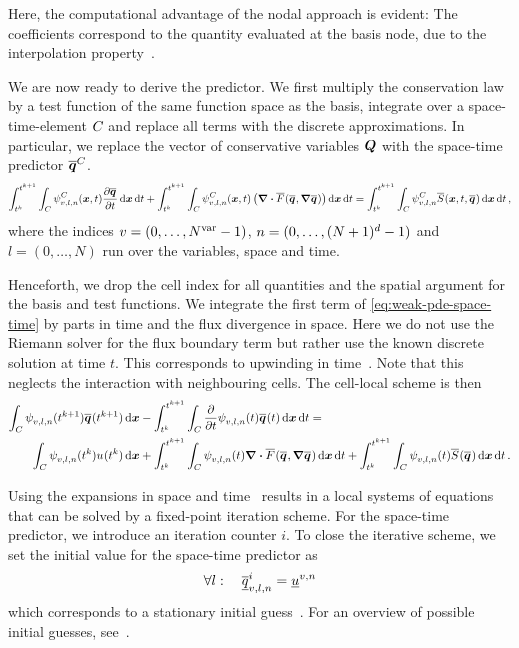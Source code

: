 Here, the computational advantage of the nodal approach is evident:
The coefficients correspond to the quantity evaluated at the basis node, due to the interpolation property~.

We are now ready to derive the predictor.
We first multiply the conservation law by a test function of the same function space as the basis, integrate over a space-time-element $C_{}$ and replace all terms with the discrete approximations.
In particular, we replace the vector of conservative variables $\bm{Q}$ with the space-time predictor $\stpredictor[\cell]$.
\begin{equation}\label{eq:weak-pde-space-time}
\intdt{\intdcell{
    \sttestfunction[\cell][v,l,n](\bm{x}, t)
    \pdv{\stpredictor}{t}
}}
+
\intdt{\intdcell{
    \sttestfunction[\cell][v,l,n](\bm{x}, t)
    \left(
      \divergence{\stflux(\stpredictor, \gradient{\stpredictor})}
    \right)
}}
=
\intdt{\intdcell{
  \sttestfunction[\cell][v,l,n] \stsource(\bm{x}, t, \stpredictor)
}},
\end{equation}
where the indices $v = (0, \ldots, N^{\text{var}}-1)$, $n = (0, \ldots, (N+1)^d - 1)$ and $l = (0, \ldots, N)$ run over the variables, space and time.

Henceforth, we drop the cell index for all quantities and the spatial argument for the basis and test functions.
We integrate the first term of \cref{eq:weak-pde-space-time} by parts in time and the flux divergence in space.
Here we do not use the Riemann solver for the flux boundary term but rather use the known discrete solution at time $t$.
This corresponds to upwinding in time~\cite{dumbser2008unified}.
Note that this neglects the interaction with neighbouring cells.
The cell-local scheme is then
\begin{align}\label{eq:space-time-predictor}
\begin{split}
\intdcell{
  \sttestfunction[][v,l,n] (\nextTime) \stpredictor(\nextTime)
}
&-
\intdt{\intdcell{
    \pdv{}{t} \sttestfunction[][v,l,n] (t) \stpredictor(t)
}}
= \\
\intdcell{
  \sttestfunction[][v,l,n] (\curTime) \ssol (\curTime)
}
&+
\intdt{\intdcell{
    \sttestfunction[][v,l,n] (t) \divergence{\stflux(\stpredictor, \gradient{\stpredictor})}
}}
+
\intdt{\intdcell{
    \sttestfunction[][v,l,n] (t) \stsource(\stpredictor)
}}.
\end{split}
\end{align}

Using the expansions in space and time~ results in a local systems of equations that can be solved by a fixed-point iteration scheme.
For the space-time predictor, we introduce an iteration counter $i$.
To close the iterative scheme, we set the initial value for the space-time predictor as
\begin{equation}
  \label{eq:initial-guess}
\forall l: \quad \stpredictorCoeff[i][v,l,n] = \ssolCoeff[v,n]
\end{equation}
which corresponds to a stationary initial guess~\cite{dumbser2008unified}.
For an overview of possible initial guesses, see~\cite{dumbser2018efficient}.

